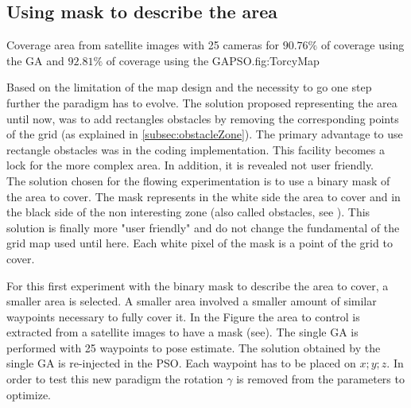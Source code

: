 
	
	\subsection{Using mask to describe the area }\label{sec:maskGAPSO}

\begin{mfigures}[!]
{Coverage area from satellite images with 25 cameras for $90.76\%$ of coverage using the GA and $92.81\%$ of coverage using the GAPSO.}{fig:TorcyMap} \centering
{}
\hspace{1cm}
\hspace{1cm}
\tabsimuposeTorcy
\end{mfigures}


Based on the limitation of the map design and the necessity to go one step further the paradigm has to evolve.
The solution proposed representing the area until now, was to add rectangles obstacles by removing the corresponding points of the grid (as explained in \ref{subsec:obstacleZone}). The primary advantage to use rectangle obstacles was in the coding implementation. 
This facility becomes a lock for the more complex area. In addition, it is revealed not user friendly.\\
 The solution chosen for the flowing experimentation is to use a binary mask of the area to cover. The mask represents in the white side the area to cover and in  the black side of the non interesting zone (also called obstacles, see ). This solution is finally more "user friendly"  and do not change the fundamental of the grid map used until here. Each white pixel of the mask is a point of the grid to cover.  
 

For this first experiment with the binary mask to describe the area to cover, a smaller area is selected. A smaller area involved a smaller amount of similar waypoints necessary to fully cover it. In the Figure  the area to control is extracted from a satellite images to have a mask (see). The single GA is performed  with 25 waypoints to pose estimate. The solution obtained by the single GA is re-injected in the PSO. Each waypoint has to be placed on $x; y; z$. In order to test this new paradigm the rotation $\gamma$ is removed from the parameters to optimize.

